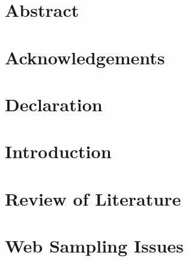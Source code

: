 \documentclass[11pt,oneside,a4paper,onecolumn,titlepage,draft]{lancsthesis}
\begin{document}
\frontmatter








\chapter*{Abstract}


\chapter*{Acknowledgements}


\chapter*{Declaration}


\tableofcontents
\listoffigures
\clearpage



\mainmatter


\chapter{Introduction}




\chapter{Review of Literature}



\chapter{Web Sampling Issues}

\end{document}
